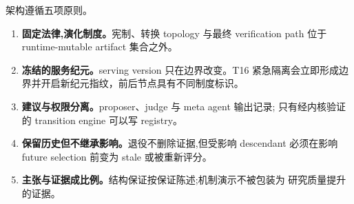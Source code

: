 架构遵循五项原则。

\begin{enumerate}
  \item \textbf{固定法律,演化制度。}宪制、转换 topology 与最终
        verification path 位于 runtime-mutable artifact 集合之外。
  \item \textbf{冻结的服务纪元。}serving version 只在边界改变。T16
        紧急隔离会立即形成边界并开启新纪元指纹，前后节点具有不同制度标识。
  \item \textbf{建议与权限分离。}proposer、judge 与 meta agent 输出记录;
        只有经内核验证的 transition engine 可以写 registry。
  \item \textbf{保留历史但不继承影响。}退役不删除证据,但受影响 descendant
        必须在影响 future selection 前变为 stale 或被重新评分。
  \item \textbf{主张与证据成比例。}结构保证按保证陈述;机制演示不被包装为
        研究质量提升的证据。
\end{enumerate}
